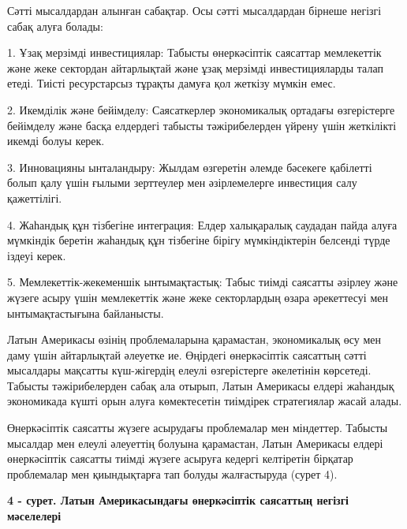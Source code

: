 \begin{multicols}{2}
Сәтті мысалдардан алынған сабақтар. Осы сәтті мысалдардан бірнеше
негізгі сабақ алуға болады:

1. Ұзақ мерзімді инвестициялар: Табысты өнеркәсіптік саясаттар
мемлекеттік және жеке сектордан айтарлықтай және ұзақ мерзімді
инвестицияларды талап етеді. Тиісті ресурстарсыз тұрақты дамуға қол
жеткізу мүмкін емес.

2. Икемділік және бейімделу: Саясаткерлер экономикалық ортадағы
өзгерістерге бейімделу және басқа елдердегі табысты тәжірибелерден
үйрену үшін жеткілікті икемді болуы керек.

3. Инновацияны ынталандыру: Жылдам өзгеретін әлемде бәсекеге қабілетті
болып қалу үшін ғылыми зерттеулер мен әзірлемелерге инвестиция салу
қажеттілігі.

4. Жаһандық құн тізбегіне интеграция: Елдер халықаралық саудадан пайда
алуға мүмкіндік беретін жаһандық құн тізбегіне бірігу мүмкіндіктерін
белсенді түрде іздеуі керек.

5. Мемлекеттік-жекеменшік ынтымақтастық: Табыс тиімді саясатты әзірлеу
және жүзеге асыру үшін мемлекеттік және жеке секторлардың өзара
әрекеттесуі мен ынтымақтастығына байланысты.

Латын Америкасы өзінің проблемаларына қарамастан, экономикалық өсу мен
даму үшін айтарлықтай әлеуетке ие. Өңірдегі өнеркәсіптік саясаттың сәтті
мысалдары мақсатты күш-жігердің елеулі өзгерістерге әкелетінін
көрсетеді. Табысты тәжірибелерден сабақ ала отырып, Латын Америкасы
елдері жаһандық экономикада күшті орын алуға көмектесетін тиімдірек
стратегиялар жасай алады.

Өнеркәсіптік саясатты жүзеге асырудағы проблемалар мен міндеттер.
Табысты мысалдар мен елеулі әлеуеттің болуына қарамастан, Латын
Америкасы елдері өнеркәсіптік саясатты тиімді жүзеге асыруға кедергі
келтіретін бірқатар проблемалар мен қиындықтарға тап болуды жалғастыруда
(сурет 4).
\end{multicols}

{\bfseries 4 - сурет. Латын Америкасындағы өнеркәсіптік саясаттың негізгі мәселелері}

